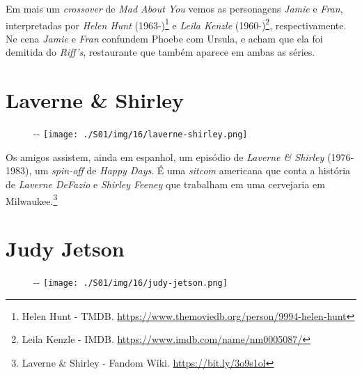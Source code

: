 Em mais um \emph{crossover} de \emph{Mad About You} vemos as personagens
\emph{Jamie} e \emph{Fran}, interpretadas por \emph{Helen Hunt}
(1963-)\footnote{\sloppy Helen Hunt - TMDB. \url{https://www.themoviedb.org/person/9994-helen-hunt}}
e \emph{Leila Kenzle} (1960-)\footnote{\sloppy Leila Kenzle - IMDB. \url{https://www.imdb.com/name/nm0005087/}},
respectivamente. Ne cena \emph{Jamie} e \emph{Fran} confundem Phoebe com
Ursula, e acham que ela foi demitida do \emph{Riff's}, restaurante que
também aparece em ambas as séries.

\hypertarget{laverne-shirley}{%
\section{Laverne \& Shirley}\label{laverne-shirley}}

\begin{figure}[!ht]
  \begin{adjustwidth}{-\oddsidemargin-1in}{-\rightmargin}
    \centering
    \texttt{[image: ./S01/img/16/laverne-shirley.png]}
  \end{adjustwidth}
\end{figure}

Os amigos assistem, ainda em espanhol, um episódio de \emph{Laverne \&
Shirley} (1976-1983), um \emph{spin-off} de \emph{Happy Days}. É uma
\emph{sitcom} americana que conta a história de \emph{Laverne DeFazio} e
\emph{Shirley Feeney} que trabalham em uma cervejaria em
Milwaukee.\footnote{\sloppy Laverne \& Shirley - Fandom Wiki. \url{https://bit.ly/3o9s1ol}}

\hypertarget{judy-jetson}{%
\section{Judy Jetson}\label{judy-jetson}}

\begin{figure}[!ht]
  \begin{adjustwidth}{-\oddsidemargin-1in}{-\rightmargin}
    \centering
    \texttt{[image: ./S01/img/16/judy-jetson.png]}
  \end{adjustwidth}
\end{figure}

